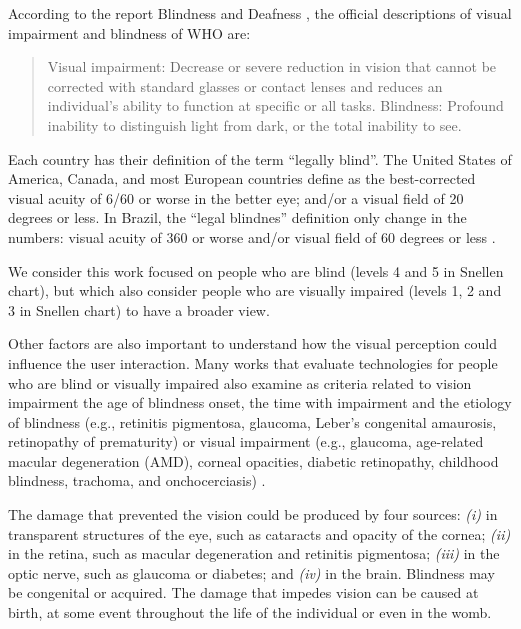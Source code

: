 According to the report Blindness and Deafness \cite{WHO2018Blindness}, the official descriptions of visual impairment and blindness of \gls{WHO} are:
\begin{quotation}
Visual impairment: Decrease or severe reduction in vision that cannot be corrected with standard glasses or contact lenses and reduces an individual’s ability to function at specific or all tasks.
Blindness: Profound inability to distinguish light from dark, or the total inability to see.
\end{quotation}

Each country has their definition of the term ``legally blind''. The United States of America, Canada, and most European countries define as the best-corrected visual acuity of 6/60 or worse in the better eye; and/or a visual field of 20 degrees or less. In Brazil, the ``legal blindnes'' definition only change in the numbers: visual acuity of 360 or worse and/or visual field of 60 degrees or less \cite{BRASIL1999DECRETO1999}.

We consider this work focused on people who are blind (levels 4 and 5 in Snellen chart), but which also consider people who are visually impaired (levels 1, 2 and 3 in Snellen chart) to have a broader view.

Other factors are also important to understand how the visual perception could influence the user interaction. Many works that evaluate technologies for people who are blind or visually impaired also examine as criteria related to vision impairment the age of blindness onset, the time with impairment \cite{Guerreiro2011} and the etiology of blindness (e.g., retinitis pigmentosa, glaucoma, Leber’s congenital amaurosis, retinopathy of prematurity) \cite{Connors2014} or visual impairment (e.g., glaucoma, age-related macular degeneration (AMD), corneal opacities, diabetic retinopathy, childhood blindness, trachoma, and onchocerciasis) \cite{WHO2018Blindness}.

The damage that prevented the vision could be produced by four sources: \textit{(i)} in transparent structures of the eye, such as cataracts and opacity of the cornea; \textit{(ii)} in the retina, such as macular degeneration and retinitis pigmentosa; \textit{(iii)} in the optic nerve, such as glaucoma or diabetes; and \textit{(iv)} in the brain. Blindness may be congenital or acquired. The damage that impedes vision can be caused at birth, at some event throughout the life of the individual or even in the womb.

